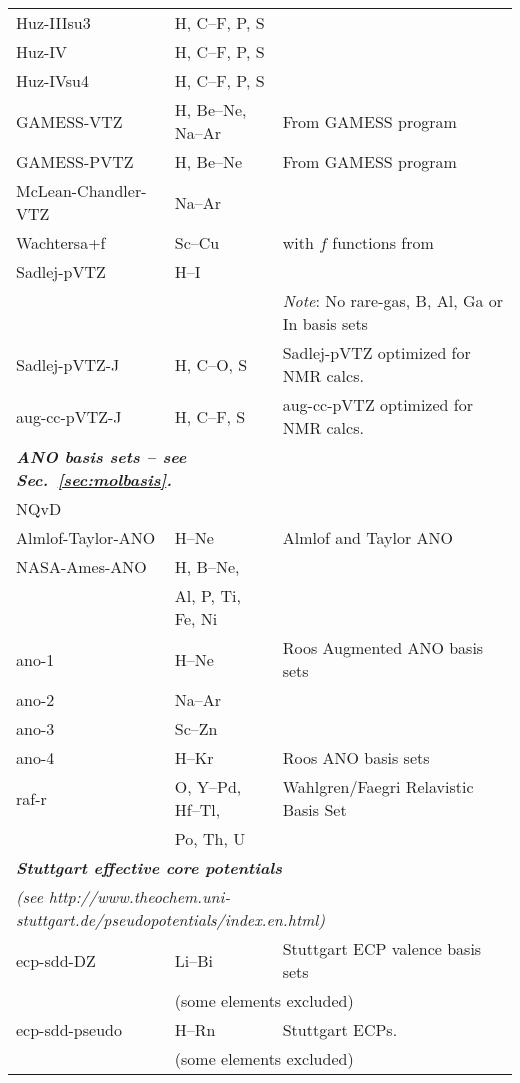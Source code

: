 \begin{longtable}{lll}
Huz-IIIsu3 & H, C--F, P, S & \cite{wkijc19,mswkjcp76,huzinagaintern}\\
Huz-IV & H, C--F, P, S & \cite{wkijc19,mswkjcp76,huzinagaintern}\\
Huz-IVsu4 & H, C--F, P, S & \cite{wkijc19,mswkjcp76,huzinagaintern}\\
\hline
GAMESS-VTZ & H, Be--Ne, Na--Ar & \cite{thdjcp55,admgscjcp72,ajhwjcp52} From GAMESS program \\
GAMESS-PVTZ & H, Be--Ne & \cite{thdjcp55,admgscjcp72,ajhwjcp52} From GAMESS program \\
%
McLean-Chandler-VTZ & Na--Ar & \cite{admgscjcp72} \\
Wachtersa+f & Sc--Cu & \cite{ajhwjcp52,wachterintern1969} with $f$ functions from \cite{cwbsrllabjcp91} \\
Sadlej-pVTZ & H--I & \cite{ajstca79,ajsmujmst234,ajstca81,ajstca81-2} \\
  &  & \emph{Note}: No rare-gas, B, Al, Ga or In basis sets\\
%
Sadlej-pVTZ-J & H, C--O, S & \cite{pfpgaaspasjcp115} Sadlej-pVTZ optimized for NMR calcs.\\
aug-cc-pVTZ-J & H, C--F, S & \cite{pfpgaaspasjcp115} aug-cc-pVTZ optimized for NMR calcs. \\
\hline
\multicolumn{2}{l}{\bf{\emph{ANO basis sets\index{basis!ANO} -- see Sec.~\ref{sec:molbasis}.}}} & \\
NQvD & & \cite{nqvdref} \\
Almlof-Taylor-ANO & H--Ne & \cite{japrtjcp86} Almlof and Taylor ANO \\
NASA-Ames-ANO & H, B--Ne, & \cite{japrtjcp86,cwbsrlaktca77} \\
  & Al, P, Ti, Fe, Ni & \\
ano-1 & H--Ne & \cite{powpambortca77} Roos Augmented ANO basis sets\\
ano-2 & Na--Ar & \cite{powbjpbortca79} \\
ano-3 & Sc--Zn & \cite{rpamminpowbortca92} \\
ano-4 & H--Kr & \cite{kpbdpowbortca90} Roos ANO basis sets\\
\hline
raf-r & O, Y--Pd, Hf--Tl, & Wahlgren/Faegri Relavistic Basis Set\\
 & Po, Th, U & \\
\hline
\multicolumn{3}{l}{\bf{\emph{Stuttgart effective core potentials}}} \\
\multicolumn{3}{l}{\emph{(see http://www.theochem.uni-stuttgart.de/pseudopotentials/index.en.html)}} \\
ecp-sdd-DZ & Li--Bi & Stuttgart ECP valence basis sets  \\
           & \multicolumn{2}{l}{(some elements excluded)}  \\
ecp-sdd-pseudo & H--Rn & Stuttgart ECPs. \\
           & \multicolumn{2}{l}{(some elements excluded)}  \\
\hline
\end{longtable}



